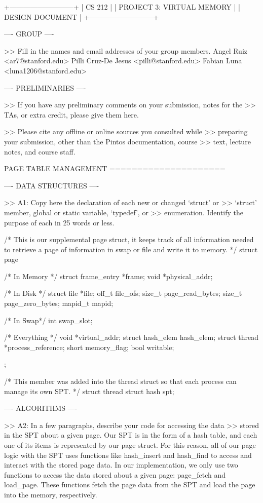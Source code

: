             +---------------------------+
            |          CS 212           |
            | PROJECT 3: VIRTUAL MEMORY |
            |      DESIGN DOCUMENT      |
            +---------------------------+

---- GROUP ----

>> Fill in the names and email addresses of your group members.
Angel Ruiz <ar7@stanford.edu>
Pilli Cruz-De Jesus <pilli@stanford.edu>
Fabian Luna <luna1206@stanford.edu>

---- PRELIMINARIES ----

>> If you have any preliminary comments on your submission, notes for the
>> TAs, or extra credit, please give them here.

>> Please cite any offline or online sources you consulted while
>> preparing your submission, other than the Pintos documentation, course
>> text, lecture notes, and course staff.

            PAGE TABLE MANAGEMENT
            =====================

---- DATA STRUCTURES ----

>> A1: Copy here the declaration of each new or changed `struct' or
>> `struct' member, global or static variable, `typedef', or
>> enumeration.  Identify the purpose of each in 25 words or less.

/* This is our supplemental page struct, it keeps
track of all information needed to retrieve a page
of information in swap or file and write it to memory. */
struct page {
    /* In Memory */
    struct frame_entry *frame;
    void *physical_addr;

    /* In Disk */
    struct file *file;
    off_t file_ofs;
    size_t page_read_bytes;
    size_t page_zero_bytes;
    mapid_t mapid;

    /* In Swap*/
    int swap_slot;

    /* Everything */
    void *virtual_addr;
    struct hash_elem hash_elem;
    struct thread *process_reference;
    short memory_flag;    
    bool writable;
};

/* This member was added into the thread struct so that each 
   process can manage its own SPT. */
struct thread
{
    struct hash spt;
}

---- ALGORITHMS ----

>> A2: In a few paragraphs, describe your code for accessing the data
>> stored in the SPT about a given page.
Our SPT is in the form of a hash table, and each one of its items is 
represented by our page struct. For this reason, all of our page logic
with the SPT uses functions like hash_insert and hash_find to access and 
interact with the stored page data. In our implementation, we only use two
functions to access the data stored about a given page: page_fetch and 
load_page. These functions fetch the page data from the SPT and load the 
page into the memory, respectively.

